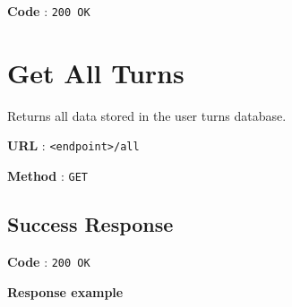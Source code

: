 \textbf{Code} : \texttt{200 OK}

\section{Get All Turns}\label{get-all-turns}

Returns all data stored in the user turns database.

\textbf{URL} : \texttt{\textless{}endpoint\textgreater{}/all}

\textbf{Method} : \texttt{GET}

\subsection{Success Response}\label{success-response-3}

\textbf{Code} : \texttt{200 OK}

\textbf{Response example}

